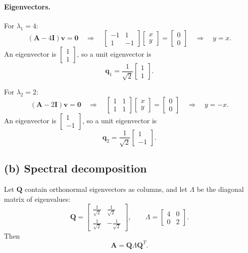 \documentclass{article}
\begin{document}
\paragraph{Eigenvectors.}
For $\lambda_1=4$:
\[
(\mathbf{A}-4\mathbf{I})\mathbf{v}=\mathbf{0}
\quad\Longrightarrow\quad
\begin{bmatrix}
-1 & 1\\
1 & -1
\end{bmatrix}
\begin{bmatrix}
x\\y
\end{bmatrix}
=
\begin{bmatrix}
0\\0
\end{bmatrix}
\quad\Longrightarrow\quad
y=x.
\]
An eigenvector is $\begin{bmatrix}1\\1\end{bmatrix}$, so a unit eigenvector is
\[
\boxed{
\mathbf{q}_1=\frac{1}{\sqrt{2}}
\begin{bmatrix}
1\\[2pt] 1
\end{bmatrix}.
}
\]

For $\lambda_2=2$:
\[
(\mathbf{A}-2\mathbf{I})\mathbf{v}=\mathbf{0}
\quad\Longrightarrow\quad
\begin{bmatrix}
1 & 1\\
1 & 1
\end{bmatrix}
\begin{bmatrix}
x\\y
\end{bmatrix}
=
\begin{bmatrix}
0\\0
\end{bmatrix}
\quad\Longrightarrow\quad
y=-x.
\]
An eigenvector is $\begin{bmatrix}1\\-1\end{bmatrix}$, so a unit eigenvector is
\[
\boxed{
\mathbf{q}_2=\frac{1}{\sqrt{2}}
\begin{bmatrix}
1\\[2pt] -1
\end{bmatrix}.
}
\]

\subsection*{(b) Spectral decomposition}

Let $\mathbf{Q}$ contain orthonormal eigenvectors as columns, and let $\Lambda$ be the diagonal matrix
of eigenvalues:
\[
\boxed{
\mathbf{Q}
=
\begin{bmatrix}
\frac{1}{\sqrt{2}} & \frac{1}{\sqrt{2}}\\[6pt]
\frac{1}{\sqrt{2}} & -\frac{1}{\sqrt{2}}
\end{bmatrix},
\qquad
\Lambda
=
\begin{bmatrix}
4 & 0\\
0 & 2
\end{bmatrix}.
}
\]
Then
\[
\boxed{\mathbf{A}=\mathbf{Q}\Lambda\mathbf{Q}^T.}
\]
\end{document}
